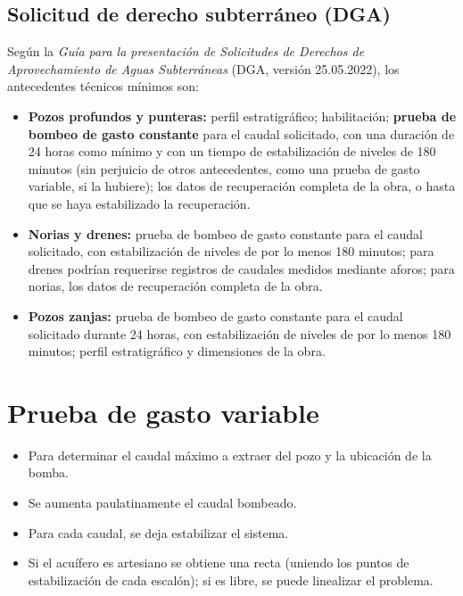 \subsection{Solicitud de derecho subterráneo (DGA)}
Según la \emph{Guía para la presentación de Solicitudes de Derechos de
Aprovechamiento de Aguas Subterráneas} (DGA, versión 25.05.2022), los
antecedentes técnicos mínimos son:
\begin{itemize}
  \item \textbf{Pozos profundos y punteras:} perfil estratigráfico;
        habilitación; \textbf{prueba de bombeo de gasto constante} para el
        caudal solicitado, con una duración de 24 horas como mínimo y con un
        tiempo de estabilización de niveles de 180 minutos (sin perjuicio de
        otros antecedentes, como una prueba de gasto variable, si la hubiere);
        los datos de recuperación completa de la obra, o hasta que se haya
        estabilizado la recuperación.
  \item \textbf{Norias y drenes:} prueba de bombeo de gasto constante para el
        caudal solicitado, con estabilización de niveles de por lo menos 180
        minutos; para drenes podrían requerirse registros de caudales medidos
        mediante aforos; para norias, los datos de recuperación completa de la obra.
  \item \textbf{Pozos zanjas:} prueba de bombeo de gasto constante para el
        caudal solicitado durante 24 horas, con estabilización de niveles de
        por lo menos 180 minutos; perfil estratigráfico y dimensiones de la obra.
\end{itemize}

\section{Prueba de gasto variable}
\begin{itemize}
  \item Para determinar el caudal máximo a extraer del pozo y la ubicación de la bomba.
  \item Se aumenta paulatinamente el caudal bombeado.
  \item Para cada caudal, se deja estabilizar el sistema.
  \item Si el acuífero es artesiano se obtiene una recta (uniendo los puntos
        de estabilización de cada escalón); si es libre, se puede linealizar el problema.
\end{itemize}

